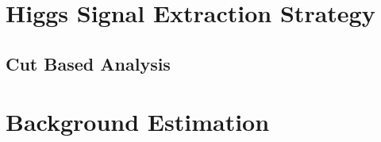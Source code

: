 \documentclass{cmspaper}
\begin{document}
\clearpage    
\section{Higgs Signal Extraction Strategy}
   
   \label{sec:signal_selection}
   \subsection{Cut Based Analysis}
     \label{sec:anal_cutbased}

\clearpage
\section{Background Estimation}
\end{document}
